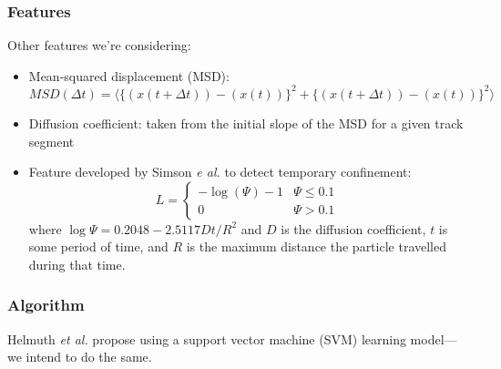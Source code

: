 \documentclass[8pt]{beamer}
\begin{document}
\begin{frame}

  \frametitle{Features}
  Other features we're considering:
  \begin{itemize}
  \item Mean-squared displacement (MSD):
    \begin{equation*}
      MSD(\Delta t) = \langle \{ (x(t+\Delta t)) - (x(t)) \}^2 + \{
       (x(t+\Delta t)) - (x(t)) \}^2 \rangle
    \end{equation*}
  \item Diffusion coefficient: taken from the initial slope of the MSD
    for a given track segment
  \item Feature developed by Simson \emph{e al.} to detect temporary
    confinement:
    \begin{equation*}
      L =
      \begin{cases}
        -\log(\Psi) -1 & \Psi \leq 0.1 \\
        0 & \Psi > 0.1
      \end{cases}
    \end{equation*}
    where $\log \Psi = 0.2048 - 2.5117 Dt/R^2$
    and $D$ is the diffusion coefficient, $t$ is some period of
    time, and $R$ is the maximum distance the particle travelled
    during that time.
  \end{itemize}

\end{frame}

\begin{frame}
  \frametitle{Algorithm}
  Helmuth \emph{et al.} propose using a support vector machine (SVM)
  learning model---we intend to do the same.
\end{frame}
\end{document}
